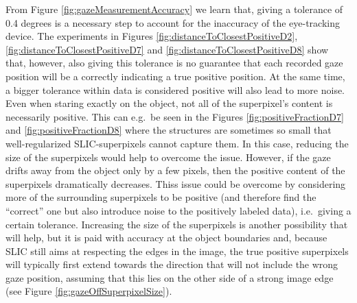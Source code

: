 From Figure \ref{fig:gazeMeasurementAccuracy} we learn that, giving a tolerance of 0.4 degrees is a necessary step to account for the inaccuracy of the eye-tracking device. The experiments in Figures \ref{fig:distanceToClosestPositiveD2}, \ref{fig:distanceToClosestPositiveD7} and \ref{fig:distanceToClosestPositiveD8} show that, however, also giving this tolerance is no guarantee that each recorded gaze position will be a correctly indicating a true positive position. At the same time, a bigger tolerance within data is considered positive will also lead to more noise. Even when staring exactly on the object, not all of the superpixel's content is necessarily positive. This can e.g.\ be seen in the Figures \ref{fig:positiveFractionD7} and \ref{fig:positiveFractionD8} where the structures are sometimes so small that well-regularized SLIC-superpixels cannot capture them. In this case, reducing the size of the superpixels would help to overcome the issue. However, if the gaze drifts away from the object only by a few pixels, then the positive content of the superpixels dramatically decreases. Thiss issue could be overcome by considering more of the surrounding superpixels to be positive (and therefore find the ``correct'' one but also introduce noise to the positively labeled data), i.e.\ giving a certain tolerance. Increasing the size of the superpixels is another possibility that will help, but it is paid with accuracy at the object boundaries and, because SLIC still aims at respecting the edges in the image, the true positive superpixels will typically first extend towards the direction that will not include the wrong gaze position, assuming that this lies on the other side of a strong image edge (see Figure \ref{fig:gazeOffSuperpixelSize}).


